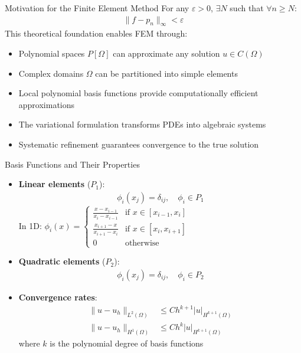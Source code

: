 \documentclass{beamer}
\begin{document}
\begin{frame}{Motivation for the Finite Element Method}
For any $\varepsilon > 0$, $\exists N$ such that $\forall n \geq N$:
\begin{align}
\|f - p_n\|_{\infty} < \varepsilon
\end{align}
This theoretical foundation enables FEM through:
\begin{itemize}
\item Polynomial spaces $P[\Omega]$ can approximate any solution $u \in C(\Omega)$
\item Complex domains $\Omega$ can be partitioned into simple elements
\item Local polynomial basis functions provide computationally efficient approximations
\item The variational formulation transforms PDEs into algebraic systems
\item Systematic refinement guarantees convergence to the true solution
\end{itemize}
\end{frame}
\begin{frame}{Basis Functions and Their Properties}
\begin{itemize}
    \item \textbf{Linear elements} ($P_1$):
    \begin{align}
    \phi_i(x_j) = \delta_{ij}, \quad \phi_i \in P_1
    \end{align}
    In 1D: $\phi_i(x) = \begin{cases}
        \frac{x-x_{i-1}}{x_i-x_{i-1}} & \text{if } x \in [x_{i-1}, x_i] \\
        \frac{x_{i+1}-x}{x_{i+1}-x_i} & \text{if } x \in [x_i, x_{i+1}] \\
        0 & \text{otherwise}
        \end{cases}$
        
    \item \textbf{Quadratic elements} ($P_2$):
    \begin{align}
    \phi_i(x_j) = \delta_{ij}, \quad \phi_i \in P_2
    \end{align}
    
    \item \textbf{Convergence rates}:
    \begin{align}
    \|u - u_h\|_{L^2(\Omega)} &\leq Ch^{k+1}|u|_{H^{k+1}(\Omega)} \\
    \|u - u_h\|_{H^1(\Omega)} &\leq Ch^{k}|u|_{H^{k+1}(\Omega)}
    \end{align}
    where $k$ is the polynomial degree of basis functions
\end{itemize}
\end{frame}
\end{document}

